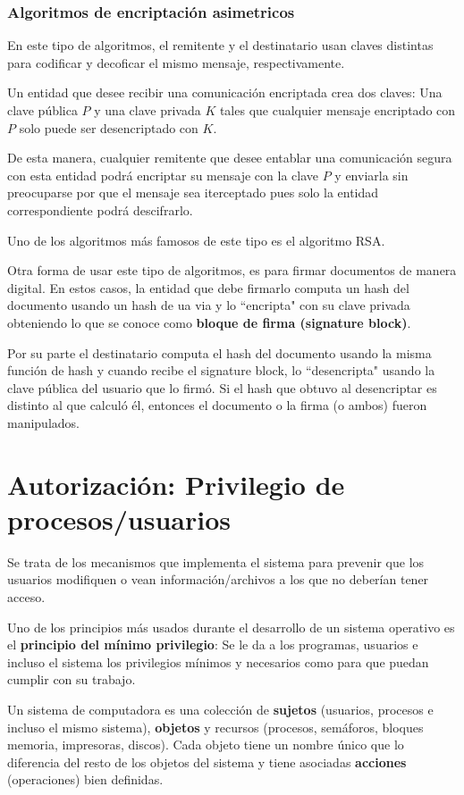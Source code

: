 \subsubsection{Algoritmos de encriptación asimetricos}
En este tipo de algoritmos, el remitente y el destinatario usan claves distintas para codificar y decoficar el mismo mensaje, respectivamente.

Un entidad que desee recibir una comunicación encriptada crea dos claves: Una clave pública $P$ y una clave privada $K$ tales que cualquier mensaje encriptado con $P$ solo puede ser desencriptado con $K$.

De esta manera, cualquier remitente que desee entablar una comunicación segura con esta entidad podrá encriptar su mensaje con la clave $P$ y enviarla sin preocuparse por que el mensaje sea iterceptado pues solo la entidad correspondiente podrá descifrarlo.

Uno de los algoritmos más famosos de este tipo es el algoritmo RSA.

Otra forma de usar este tipo de algoritmos, es para firmar documentos de manera digital. En estos casos, la entidad que debe firmarlo computa un hash del documento usando un hash de ua via y lo ``encripta" con su clave privada obteniendo lo que se conoce como \textbf{bloque de firma (signature block)}.

Por su parte el destinatario computa el hash del documento usando la misma función de hash y cuando recibe el signature block, lo ``desencripta" usando la clave pública del usuario que lo firmó. Si el hash que obtuvo al desencriptar es distinto al que calculó él, entonces el documento o la firma (o ambos) fueron manipulados.

\newpage
\section{Autorización: Privilegio de procesos/usuarios}\label{privilegios}
Se trata de los mecanismos que implementa el sistema para prevenir que los usuarios modifiquen o vean información/archivos a los que no deberían tener acceso.

Uno de los principios más usados durante el desarrollo de un sistema operativo es el \textbf{principio del mínimo privilegio}: Se le da a los programas, usuarios e incluso el sistema los privilegios mínimos y necesarios como para que puedan cumplir con su trabajo.

Un sistema de computadora es una colección de \textbf{sujetos} (usuarios, procesos e incluso el mismo sistema), \textbf{objetos} y recursos (procesos, semáforos, bloques memoria, impresoras, discos). Cada objeto tiene un nombre único que lo diferencia del resto de los objetos del sistema y tiene asociadas \textbf{acciones} (operaciones) bien definidas.

